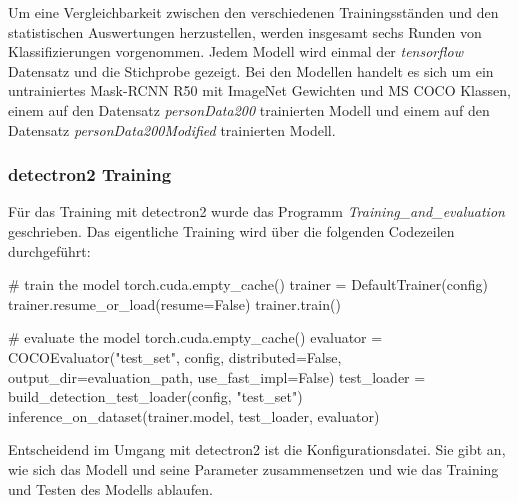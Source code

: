 \documentclass[a4paper,12pt,ngerman]{article}
\begin{document}
Um eine Vergleichbarkeit zwischen den verschiedenen Trainingsständen und den statistischen Auswertungen herzustellen, werden insgesamt sechs Runden von Klassifizierungen vorgenommen. Jedem Modell wird einmal der \textit{tensorflow} Datensatz und die Stichprobe gezeigt. Bei den Modellen handelt es sich um ein untrainiertes Mask-RCNN R50 mit ImageNet Gewichten und MS COCO Klassen, einem auf den Datensatz \textit{personData200} trainierten Modell und einem auf den Datensatz \textit{personData200Modified} trainierten Modell. \\

\subsubsection{detectron2 Training}

Für das Training mit detectron2 wurde das Programm \textit{Training\_and\_evaluation} geschrieben. Das eigentliche Training wird über die folgenden Codezeilen durchgeführt: \\

\begin{python}
# train the model
torch.cuda.empty_cache()
trainer = DefaultTrainer(config)
trainer.resume_or_load(resume=False)
trainer.train()

# evaluate the model
torch.cuda.empty_cache()
evaluator = COCOEvaluator("test_set", config, distributed=False, output_dir=evaluation_path, use_fast_impl=False)
test_loader = build_detection_test_loader(config, "test_set")
inference_on_dataset(trainer.model, test_loader, evaluator)
\end{python}

Entscheidend im Umgang mit detectron2 ist die Konfigurationsdatei. Sie gibt an, wie sich das Modell und seine Parameter zusammensetzen und wie das Training und Testen des Modells ablaufen. \\
\end{document}
